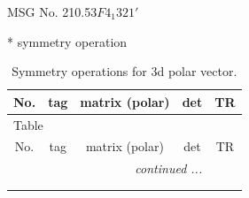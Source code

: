\documentclass[fleqn,8pt]{jsarticle}
\begin{document}
\setcounter{MaxMatrixCols}{32}

\renewcommand{\tablename}{Table~}
\renewcommand{\figurename}{Figure~}
\begin{center}
\LARGE
MSG No. 210.53\quad$F4_{1}321'$
\end{center}
* symmetry operation
\renewcommand{\arraystretch}{1.3}
\begin{longtable}{ccccc}
\caption{Symmetry operations for 3d polar vector.}
 \\
 \hline \hline
No. & tag & matrix (polar) & det & TR \\ \hline \endfirsthead

\multicolumn{4}{l}{\tablename\ \thetable{}} \\
 \hline \hline
No. & tag & matrix (polar) & det & TR \\ \hline \endhead

 \hline \hline
\multicolumn{4}{r}{\footnotesize\it continued ...} \\ \endfoot

 \hline \hline
\multicolumn{4}{r}{} \\ \endlastfoot


\end{longtable}
\end{document}
